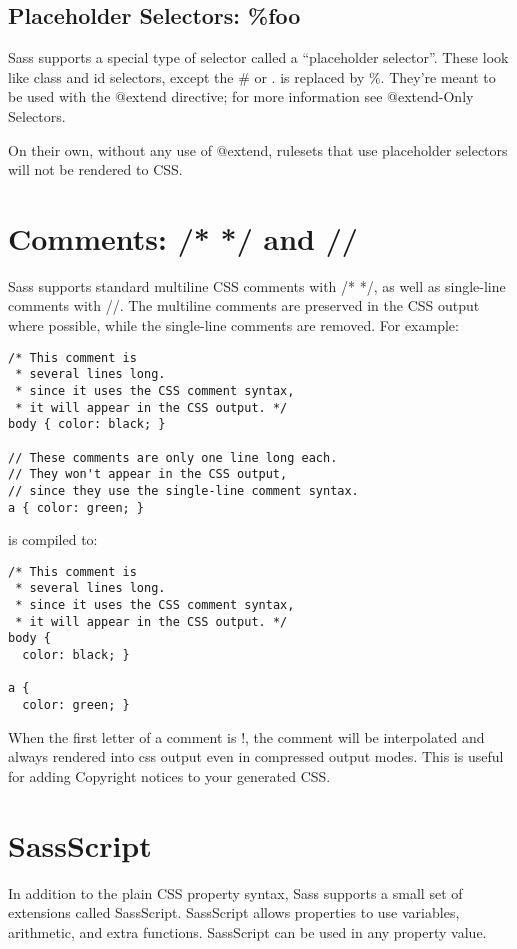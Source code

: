 \documentclass[9pt]{article}
\begin{document}
\subsection{Placeholder Selectors: \%foo}


 Sass supports a special type of selector called a “placeholder selector”. These look like class and id selectors, except the \# or . is replaced by \%. They’re meant to be used with the @extend directive; for more information see @extend-Only Selectors.


 On their own, without any use of @extend, rulesets that use placeholder selectors will not be rendered to CSS.
\section{Comments: /* */ and //}


 Sass supports standard multiline CSS comments with /* */, as well as single-line comments with //. The multiline comments are preserved in the CSS output where possible, while the single-line comments are removed. For example:
\begin{verbatim}
/* This comment is
 * several lines long.
 * since it uses the CSS comment syntax,
 * it will appear in the CSS output. */
body { color: black; }

// These comments are only one line long each.
// They won't appear in the CSS output,
// since they use the single-line comment syntax.
a { color: green; }
\end{verbatim}


 is compiled to:
\begin{verbatim}
/* This comment is
 * several lines long.
 * since it uses the CSS comment syntax,
 * it will appear in the CSS output. */
body {
  color: black; }

a {
  color: green; }
\end{verbatim}


 When the first letter of a comment is !, the comment will be interpolated and always rendered into css output even in compressed output modes. This is useful for adding Copyright notices to your generated CSS.
\section{SassScript}


 In addition to the plain CSS property syntax, Sass supports a small set of extensions called SassScript. SassScript allows properties to use variables, arithmetic, and extra functions. SassScript can be used in any property value.
\end{document}
